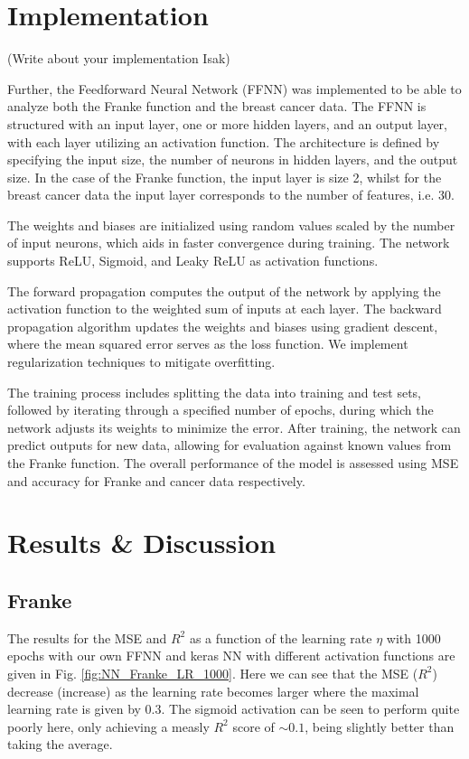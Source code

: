 \documentclass[%
reprint,
amsmath,amssymb,
aps,
]{revtex4-2}
\begin{document}
\section{Implementation}
(Write about your implementation Isak)

Further, the Feedforward Neural Network (FFNN) was implemented to be able to analyze both the Franke function and the breast cancer data. The FFNN is structured with an input layer, one or more hidden layers, and an output layer, with each layer utilizing an activation function. The architecture is defined by specifying the input size, the number of neurons in hidden layers, and the output size. In the case of the Franke function, the input layer is size 2, whilst for the breast cancer data the input layer corresponds to the number of features, i.e. $30$.

The weights and biases are initialized using random values scaled by the number of input neurons, which aids in faster convergence during training. The network supports ReLU, Sigmoid, and Leaky ReLU as activation functions. 

The forward propagation computes the output of the network by applying the activation function to the weighted sum of inputs at each layer. The backward propagation algorithm updates the weights and biases using gradient descent, where the mean squared error serves as the loss function. We implement regularization techniques to mitigate overfitting.

The training process includes splitting the data into training and test sets, followed by iterating through a specified number of epochs, during which the network adjusts its weights to minimize the error. After training, the network can predict outputs for new data, allowing for evaluation against known values from the Franke function. The overall performance of the model is assessed using MSE and accuracy for Franke and cancer data respectively.


\section{Results \& Discussion}

\subsection{Franke}
The results for the MSE and $R^2$ as a function of the learning rate $\eta$ with 1000 epochs with our own FFNN and keras NN with different activation functions are given in Fig. \ref{fig:NN_Franke_LR_1000}. Here we can see that the MSE ($R^2$) decrease (increase) as the learning rate becomes larger where the maximal learning rate is given by $0.3$. The sigmoid activation can be seen to perform quite poorly here, only achieving a measly $R^2$ score of $\sim0.1$, being slightly better than taking the average. 
\end{document}
